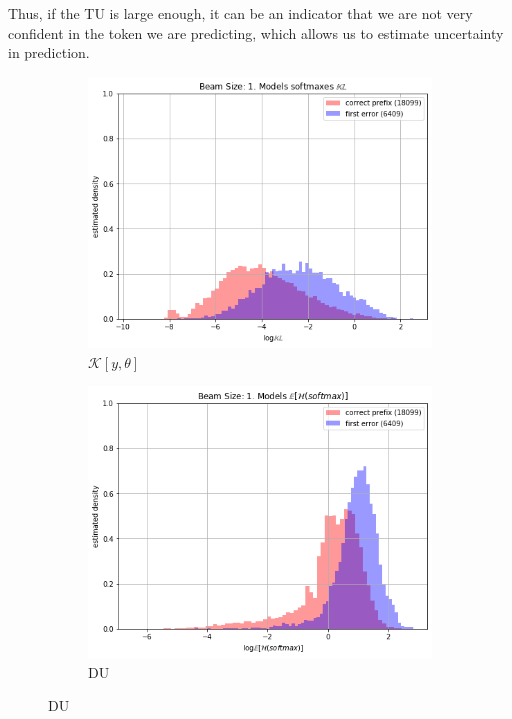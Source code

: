 \documentclass[a4paper,14pt]{extarticle}
\begin{document}
	Thus, if the TU is large enough, it can be an indicator that we are not very confident in the token we are predicting, which allows us to estimate uncertainty in prediction.
	
	\begin{figure}[t]
		\begin{subfigure}{.45\textwidth}
			\centering
			\includegraphics[width=1\textwidth]{images/ens_kl.png}
			\caption{$\mathcal{K}[y, \theta]$} \label{fig:ens_kl}
		\end{subfigure}
		\begin{subfigure}{.45\textwidth}
			\centering
			\includegraphics[width=1\textwidth]{images/ens_du.png}
			\caption{DU} \label{fig:ens_du}
		\end{subfigure}
	\end{figure}
	
\end{document}
